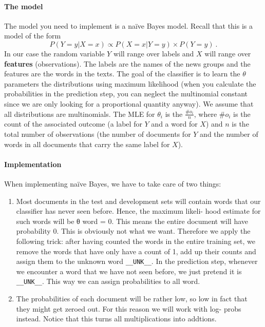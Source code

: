 \documentclass[11pt, leqno, a4paper]{article}
\begin{document}
\paragraph{The model} The model you need to implement is a na\"ive Bayes model. Recall that this is a model
of the form
$$ P(Y=y|X=x) \propto P(X=x|Y=y) \times P(Y=y) \ . $$
In our case the random variable $ Y $ will range over labels and $ X $ will range over \textbf{features} (observations).
The labels are the names of the news groups and the features are the words in the texts. The goal of the classifier is
to learn the $ \theta $ parameters the distributions using maximum likelihood (when you calculate the probabilities
in the prediction step, you can neglect the multinomial constant since we are only looking for a proportional
quantity anyway). We assume that all distributions are multinomials. The MLE for $ \theta_{i} $ is the $ \frac{\#o_{i}}{n} $,
where $ \#o_{i} $ is the count of the associated outcome (a label for $ Y $ and a word for $ X $) and $ n $ is the total
number of observations (the number of documents for $ Y $ and the number of words in all documents that carry the same
label for $ X $). 

\paragraph{Implementation} When implementing na\"ive Bayes, we have to take care of two things:
\begin{enumerate}
\item Most documents in the test and development sets will contain words
that our classifier has never seen before. Hence, the maximum likeli-
hood estimate for such words will be θ word = 0. This means the entire
document will have probability 0. This is obviously not what we want.
Therefore we apply the following trick: after having counted the words
in the entire training set, we remove the words that have only have a
count of 1, add up their counts and assign them to the unknown word
\texttt{\_\_UNK\_\_}. In the prediction step, whenever we encounter a word that we
have not seen before, we just pretend it is \texttt{\_\_UNK\_\_}. This way we can
assign probabilities to all word.
\item The probabilities of each document will be rather low, so low in fact
that they might get zeroed out. For this reason we will work with log-
probs instead. Notice that this turns all multiplications into addtions.
\end{enumerate}
\end{document}
